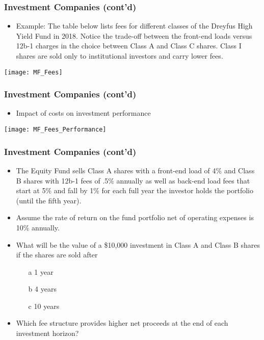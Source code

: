 \documentclass[10pt]{beamer}
\begin{document}
	
	
	\begin{frame}
		\frametitle{Investment Companies (cont'd)}
		
		\begin{itemize} 
			\scriptsize \item Example: The table below lists fees for different classes of the Dreyfus High Yield Fund in 2018.
			Notice the trade-off between the front-end loads versus 12b-1 charges in the choice between Class A and Class C shares. Class I shares are sold only to institutional investors and carry lower fees.
			
		\end{itemize}
		
		\begin{center} 
			\texttt{[image: MF\_Fees]}		
		\end{center}
		
	\end{frame}
	
	
	
	\begin{frame}
		\frametitle{Investment Companies (cont'd)}
		
		\begin{itemize} 
			\item Impact of costs on investment performance
			
		\end{itemize}
		
		\begin{center} 
			\texttt{[image: MF\_Fees\_Performance]}		
		\end{center}
		
	\end{frame}
	
	
	
	\begin{frame}
		\frametitle{Investment Companies (cont'd)}
		
		\begin{itemize} 
			\item The Equity Fund sells Class A shares with a front-end load of 4\% and Class B shares with 12b-1 fees of .5\% annually as well as back-end load fees that start at 5\% and fall by 1\% for each full year the investor holds the portfolio (until the fifth year). 
			\item Assume the rate of return on the fund portfolio net of operating expenses is 10\% annually.
			\item What will be the value of a \$10,000 investment in Class A and Class B shares if the shares are sold after
			\begin{itemize}
				\item[a] 1 year
				\item[b] 4 years
				\item[c] 10 years
			\end{itemize}
			\item Which fee structure provides higher net proceeds at the end of each	investment horizon?
		\end{itemize}
		
	\end{frame}
	
\end{document}
